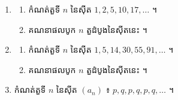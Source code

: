 \begin{enumerate}[1]
\begin{enumerate}[a]
  \end{enumerate}
  \item \begin{enumerate}[a]
    \item កំណត់តួទី $n$ នៃស៊ីត $1, 2, 5, 10, 17, \ldots$ ។
    \item គណនាផលបូក $n$ តួដំបូងនៃស៊ីតនេះ ។
  \end{enumerate}
  \item \begin{enumerate}[a]
    \item កំណត់តួទី $n$ នៃស៊ីត $1, 5, 14, 30, 55, 91, \ldots$ ។
    \item គណនាផលបូក $n$ តួដំបូងនៃស៊ីតនេះ ។
  \end{enumerate}
  \item កំណត់តួទី $n$ នៃស៊ីត $(a_n)$ ៖ $p, q, p, q, p, q, \ldots$ ។
\end{enumerate}
